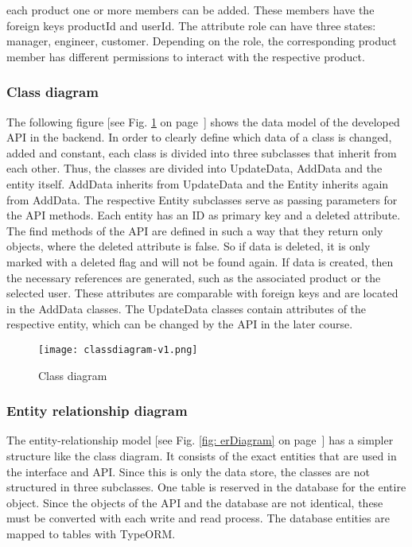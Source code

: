 each product one or more members can be added. These members have the foreign keys productId and userId. The attribute role can have three states: manager, engineer, customer. Depending on the role, the corresponding product member has different permissions to interact with the respective product.


    \subsubsection*{Class diagram}
    The following figure [see Fig. \ref{fig: classdiagram} on page~\pageref{fig: classdiagram}] shows the data model of the developed API in the backend. In order to clearly define which data of a class is changed, added and constant, each class is divided into three subclasses that inherit from each other. Thus, the classes are divided into UpdateData, AddData and the entity itself. AddData inherits from UpdateData and the Entity inherits again from AddData. The respective Entity subclasses serve as passing parameters for the API methods. Each entity has an ID as primary key and a deleted attribute. The find methods of the API are defined in such a way that they return only objects, where the deleted attribute is false. So if data is deleted, it is only marked with a deleted flag and will not be found again. If data is created, then the necessary references are generated, such as the associated product or the selected user. These attributes are comparable with foreign keys and are located in the AddData classes. The UpdateData classes contain attributes of the respective entity, which can be changed by the API in the later course. 

    \begin{figure}[h]
        \centering
        \texttt{[image: classdiagram-v1.png]}
        \caption{Class diagram}
        \label{fig: classdiagram}
    \end{figure}


    \subsubsection*{Entity relationship diagram} %
    The entity-relationship model [see Fig. \ref{fig: erDiagram} on page~\pageref{fig: erDiagram}] has a simpler structure like the class diagram. It consists of the exact entities that are used in the interface and API. Since this is only the data store, the classes are not structured in three subclasses. One table is reserved in the database for the entire object. Since the objects of the API and the database are not identical, these must be converted with each write and read process. The database entities are mapped to tables with TypeORM. 

